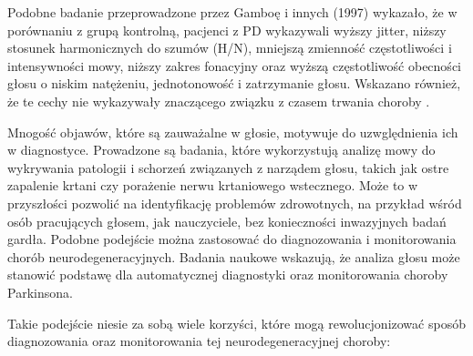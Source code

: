 Podobne badanie przeprowadzone przez Gamboę i innych (1997) wykazało, że w porównaniu z grupą kontrolną, pacjenci z PD wykazywali wyższy jitter, niższy stosunek harmonicznych do szumów (H/N), mniejszą zmienność częstotliwości i intensywności mowy, niższy zakres fonacyjny oraz wyższą częstotliwość obecności głosu o niskim natężeniu, jednotonowość i zatrzymanie głosu.
Wskazano również, że te cechy nie wykazywały znaczącego związku z czasem trwania choroby \cite{GAMBOA1997314}.

\vspace{0.5cm}

Mnogość objawów, które są zauważalne w głosie, motywuje do uzwględnienia ich w diagnostyce.
Prowadzone są badania, które wykorzystują analizę mowy do wykrywania patologii i schorzeń związanych z narządem głosu, takich jak ostre zapalenie krtani czy porażenie nerwu krtaniowego wstecznego.
Może to w przyszłości pozwolić na identyfikację problemów zdrowotnych, na przykład wśród osób pracujących głosem, jak nauczyciele, bez konieczności inwazyjnych badań gardła.
Podobne podejście można zastosować do diagnozowania i monitorowania chorób neurodegeneracyjnych.
Badania naukowe wskazują, że analiza głosu może stanowić podstawę dla automatycznej diagnostyki oraz monitorowania choroby Parkinsona.

Takie podejście niesie za sobą wiele korzyści, które mogą rewolucjonizować sposób diagnozowania oraz monitorowania tej neurodegeneracyjnej choroby:

